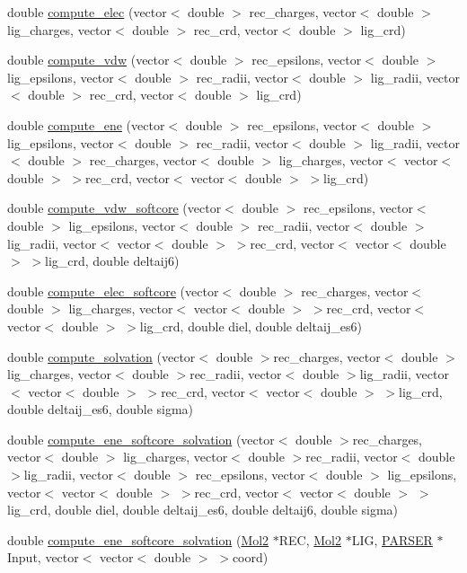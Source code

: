\begin{DoxyCompactItemize}
\item 
double \hyperlink{classENERGY_a7ee01a8c6db5ab51a468c9d7ce3dea2f}{compute\_\-elec} (vector$<$ double $>$ rec\_\-charges, vector$<$ double $>$ lig\_\-charges, vector$<$ double $>$ rec\_\-crd, vector$<$ double $>$ lig\_\-crd)
\item 
double \hyperlink{classENERGY_a8c733b5450a52c8ed45709bb7c83fea3}{compute\_\-vdw} (vector$<$ double $>$ rec\_\-epsilons, vector$<$ double $>$ lig\_\-epsilons, vector$<$ double $>$ rec\_\-radii, vector$<$ double $>$ lig\_\-radii, vector$<$ double $>$ rec\_\-crd, vector$<$ double $>$ lig\_\-crd)
\item 
double \hyperlink{classENERGY_a71a6fd89c93fcd0a0a3a671c761972c2}{compute\_\-ene} (vector$<$ double $>$ rec\_\-epsilons, vector$<$ double $>$ lig\_\-epsilons, vector$<$ double $>$ rec\_\-radii, vector$<$ double $>$ lig\_\-radii, vector$<$ double $>$ rec\_\-charges, vector$<$ double $>$ lig\_\-charges, vector$<$ vector$<$ double $>$ $>$rec\_\-crd, vector$<$ vector$<$ double $>$ $>$lig\_\-crd)
\item 
double \hyperlink{classENERGY_a4751b0e8d0d3ce83b2f447236b7e8e38}{compute\_\-vdw\_\-softcore} (vector$<$ double $>$ rec\_\-epsilons, vector$<$ double $>$ lig\_\-epsilons, vector$<$ double $>$ rec\_\-radii, vector$<$ double $>$ lig\_\-radii, vector$<$ vector$<$ double $>$ $>$rec\_\-crd, vector$<$ vector$<$ double $>$ $>$lig\_\-crd, double deltaij6)
\item 
double \hyperlink{classENERGY_a2823f8524885ae4866f7baf9d6736359}{compute\_\-elec\_\-softcore} (vector$<$ double $>$ rec\_\-charges, vector$<$ double $>$ lig\_\-charges, vector$<$ vector$<$ double $>$ $>$rec\_\-crd, vector$<$ vector$<$ double $>$ $>$lig\_\-crd, double diel, double deltaij\_\-es6)
\item 
double \hyperlink{classENERGY_a712ccab3019a6cb120b2b49e5391898c}{compute\_\-solvation} (vector$<$ double $>$rec\_\-charges, vector$<$ double $>$ lig\_\-charges, vector$<$ double $>$rec\_\-radii, vector$<$ double $>$lig\_\-radii, vector$<$ vector$<$ double $>$ $>$rec\_\-crd, vector$<$ vector$<$ double $>$ $>$lig\_\-crd, double deltaij\_\-es6, double sigma)
\item 
double \hyperlink{classENERGY_a161909a8b166eeb653561abfcb49c54b}{compute\_\-ene\_\-softcore\_\-solvation} (vector$<$ double $>$rec\_\-charges, vector$<$ double $>$ lig\_\-charges, vector$<$ double $>$rec\_\-radii, vector$<$ double $>$lig\_\-radii, vector$<$ double $>$ rec\_\-epsilons, vector$<$ double $>$ lig\_\-epsilons, vector$<$ vector$<$ double $>$ $>$rec\_\-crd, vector$<$ vector$<$ double $>$ $>$lig\_\-crd, double diel, double deltaij\_\-es6, double deltaij6, double sigma)
\item 
\hypertarget{classENERGY_a901cb83200ea5e4bc5d3c47ab95d2b0a}{
double \hyperlink{classENERGY_a901cb83200ea5e4bc5d3c47ab95d2b0a}{compute\_\-ene\_\-softcore\_\-solvation} (\hyperlink{classMol2}{Mol2} $\ast$REC, \hyperlink{classMol2}{Mol2} $\ast$LIG, \hyperlink{classPARSER}{PARSER} $\ast$Input, vector$<$ vector$<$ double $>$ $>$coord)}
\label{classENERGY_a901cb83200ea5e4bc5d3c47ab95d2b0a}


\end{DoxyCompactItemize}
